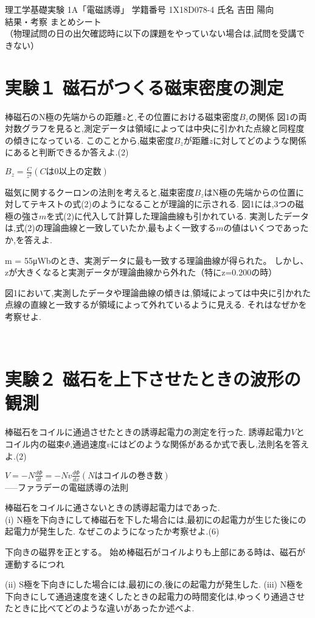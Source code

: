 \documentclass[11pt]{jsarticle}
\begin{document}
\newpage
理工学基礎実験 1A「電磁誘導」 	学籍番号 1X18D078-4 氏名 吉田 陽向 \\
結果・考察 まとめシート \\
（物理試問の日の出欠確認時に以下の課題をやっていない場合は,試問を受講できない）\\
\section{実験１ 磁石がつくる磁束密度の測定} 
棒磁石のN極の先端からの距離$z$と,その位置における磁束密度$B_z$の関係 
図1の両対数グラフを見ると,測定データは領域によっては中央に引かれた点線と同程度の傾きになっている.
このことから,磁束密度$B_z$が距離$z$に対してどのような関係にあると判断できるか答えよ.(2)
\begin{screen}
    $B_z = \frac{C}{z^2} (Cは0以上の定数)$
\end{screen}
磁気に関するクーロンの法則を考えると,磁束密度$B_z$はN極の先端からの位置に対してテキストの式(2)のようになることが理論的に示される.
図1には,3つの磁極の強さ$m$を式(2)に代入して計算した理論曲線も引かれている.
実測したデータは,式(2)の理論曲線と一致していたか,最もよく一致する$m$の値はいくつであったか,を答えよ.
\begin{screen}
    m = 55μWbのとき、実測データに最も一致する理論曲線が得られた。
    しかし、zが大きくなると実測データが理論曲線から外れた（特にz=0.200の時）
\end{screen}
図1において,実測したデータや理論曲線の傾きは,領域によっては中央に引かれた点線の直線と一致するが領域によって外れているように見える.
それはなぜかを考察せよ.
\begin{screen}
    \
    \
    \
    \
\end{screen}
\section{実験２ 磁石を上下させたときの波形の観測}
棒磁石をコイルに通過させたときの誘導起電力の測定を行った.
誘導起電力$V$とコイル内の磁束$\Phi$,通過速度$v$にはどのような関係があるか式で表し,法則名を答えよ.(2)
\begin{screen}
    $V = -N\frac{d\Phi}{dt} = -Nv\frac{d\Phi}{dx}(Nはコイルの巻き数)$\\
    \hspace{100pt} -----ファラデーの電磁誘導の法則
\end{screen}
棒磁石をコイルに通さないときの誘導起電力はであった. \\
(i) N極を下向きにして棒磁石を下した場合には,最初に\fbox{負の方向}の起電力が生じた後に\fbox{正の方向}の起電力が発生した.
なぜこのようになったか考察せよ.(6)
\begin{screen}
    下向きの磁界を正とする。
    始め棒磁石がコイルよりも上部にある時は、磁石が運動するにつれ\
    \
    \
    \
    \
    \
\end{screen}
(ii) S極を下向きにした場合には,最初に\fbox{\phantom{正の方向}}の,後に\fbox{\phantom{負の方向}}の起電力が発生した.
(iii) N極を下向きにして通過速度を速くしたときの起電力の時間変化は,ゆっくり通過させたときに比べてどのような違いがあったか述べよ.
\begin{screen}

\end{screen}
\end{document}

